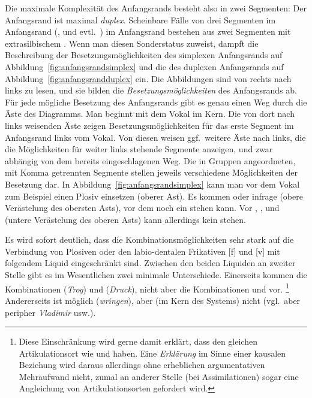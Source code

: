 Die maximale Komplexität des Anfangsrands besteht also in zwei Segmenten:
Der Anfangsrand ist maximal \textit{duplex}.
Scheinbare Fälle von drei Segmenten im Anfangsrand (\textipa{[SpK]}, \textipa{[StK]} und evtl.\ \textipa{[Spl]}) im Anfangsrand bestehen aus zwei Segmenten mit extrasilbischem \textipa{[S]}.
Wenn man \textipa{[S]} diesen Sonderstatus zuweist, dampft die Beschreibung der Besetzungsmöglichkeiten des simplexen Anfangsrands auf Abbildung~\ref{fig:anfangsrandsimplex} und die des duplexen Anfangsrands auf Abbildung~\ref{fig:anfangsrandduplex} ein.
Die Abbildungen sind von rechts nach links zu lesen, und sie bilden die \textit{Besetzungsmöglichkeiten} des Anfangsrands ab.
Für jede mögliche Besetzung des Anfangsrands gibt es genau einen Weg durch die Äste des Diagramms.
Man beginnt mit dem Vokal im Kern.
Die von dort nach links weisenden Äste zeigen Besetzungsmöglichkeiten für das erste Segment im Anfangsrand links vom Vokal.
Von diesen weisen ggf.\ weitere Äste nach links, die die Möglichkeiten für weiter links stehende Segmente anzeigen, und zwar abhängig von dem bereits eingeschlagenen Weg.
Die in Gruppen angeordneten, mit Komma getrennten Segmente stellen jeweils verschiedene Möglichkeiten der Besetzung dar.
In Abbildung~\ref{fig:anfangsrandsimplex} kann man vor dem Vokal zum Beispiel einen Plosiv einsetzen (oberer Ast).
Es kommen \textipa{[p]} oder \textipa{[t]} infrage (obere Verästelung des obersten Asts), vor dem noch ein \textipa{[S]} stehen kann.
Vor \textipa{[b]}, \textipa{[d]}, \textipa{[k]} und \textipa{[g]} (untere Verästelung des oberen Asts) kann allerdings kein \textipa{[S]} stehen.

Es wird sofort deutlich, dass die Kombinationsmöglichkeiten sehr stark auf die Verbindung von Plosiven oder den labio-dentalen Frikativen [f] und [v] mit folgendem Liquid eingeschränkt sind.
Zwischen den beiden Liquiden an zweiter Stelle gibt es im Wesentlichen zwei minimale Unterschiede.
Einerseits kommen die Kombinationen \textipa{[tK]} (\textit{Trog}) und \textipa{[dK]} (\textit{Druck}), nicht aber die Kombinationen \textipa{[tl]} und \textipa{[dl]} vor.%
\footnote{Diese Einschränkung wird gerne damit erklärt, dass \textipa{[l]} den gleichen Artikulationsort wie \textipa{[t]} und \textipa{[d]} haben.
Eine \textit{Erklärung} im Sinne einer kausalen Beziehung wird daraus allerdings ohne erheblichen argumentativen Mehraufwand nicht, zumal an anderer Stelle (bei Assimilationen) sogar eine Angleichung von Artikulationsorten gefordert wird.}
Andererseits ist \textipa{[vK]} möglich (\textit{wringen}), aber (im Kern des Systems) \textipa{[vl]} nicht (vgl.\ aber peripher \textit{Vladimir} usw.).

